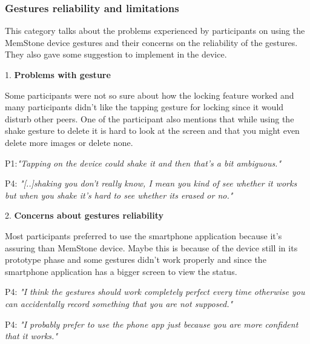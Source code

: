 \documentclass[mscthesis]{usiinfthesis}
\begin{document}
\subsubsection*{Gestures reliability and limitations}

This category talks about the problems experienced by participants on using the MemStone device gestures and their concerns on the reliability of the gestures. They also gave some suggestion to implement in the device.
\newline

1. \textbf{Problems with gesture}

Some participants were not so sure about how the locking feature worked and many participants didn't like the tapping gesture for locking since it would disturb other peers. One of the participant also mentions that while using the shake gesture to delete it is hard to look at the screen and that you might even delete more images or delete none.
\newline
\hspace{\parindent}\begin{adjustwidth}{1cm}{1cm}
\hspace{\parindent}P1:\textit{"Tapping on the device could shake it and then that's a bit ambiguous."}

P4: \textit{"[..]shaking you don't really know, I mean you kind of see whether it works but when you shake it's hard to see whether its erased or no."}
\newline
\end{adjustwidth}

2. \textbf{Concerns about gestures reliability }

Most participants preferred to use the smartphone application because it's assuring than MemStone device. Maybe this is because of the device still in its prototype phase and some gestures didn't work properly and since the smartphone application has a bigger screen to view the status. 
\newline
\hspace{\parindent}\begin{adjustwidth}{1cm}{1cm}
\hspace{\parindent}P4: \textit{"I think the gestures should work completely perfect every time otherwise you can accidentally record something that you are not supposed."}

P4: \textit{"I probably prefer to use the phone app just because you are more confident that it works."}
\newline
\end{adjustwidth}
\end{document}
